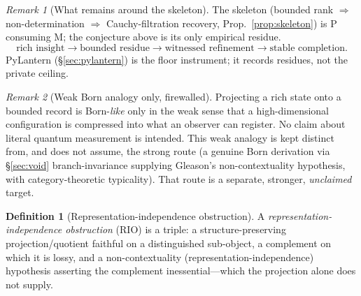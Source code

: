 \documentclass[11pt]{article}
\theoremstyle{definition}
\newtheorem{definition}{Definition}
\theoremstyle{remark}
\newtheorem*{remark}{Remark}
\begin{document}
\begin{remark}[What remains around the skeleton]
The skeleton (bounded rank $\Rightarrow$ non-determination $\Rightarrow$ Cauchy-filtration
recovery, Prop.~\ref{prop:skeleton}) is P consuming M; the conjecture above is its only empirical
residue.
\[
  \text{rich insight} \to \text{bounded residue} \to \text{witnessed refinement} \to \text{stable completion}.
\]
PyLantern (\S\ref{sec:pylantern}) is the floor instrument; it records residues, not the private
ceiling.
\end{remark}

\begin{remark}[Weak Born analogy only, firewalled]
Projecting a rich state onto a bounded record is Born-\emph{like} only in the weak sense that a
high-dimensional configuration is compressed into what an observer can register. No claim about literal
quantum measurement is intended. This weak analogy is kept distinct from, and does not assume, the
strong route (a genuine Born derivation via \S\ref{sec:void} branch-invariance supplying Gleason's
non-contextuality hypothesis, with category-theoretic typicality). That route is a separate, stronger,
\emph{unclaimed} target.
\end{remark}

\begin{definition}[Representation-independence obstruction]\label{def:rio}
A \emph{representation-independence obstruction} (RIO) is a triple: a structure-preserving
projection/quotient faithful on a distinguished sub-object, a complement on which it is lossy, and a
non-contextuality (representation-independence) hypothesis asserting the complement
inessential---which the projection alone does not supply.
\end{definition}
\end{document}
